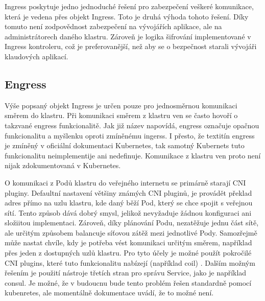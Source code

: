 Ingress poskytuje jedno jednoduché řešení pro zabezpečení veškeré komunikace, která je vedena přes objekt Ingress. Toto je druhá výhoda tohoto řešení. Díky tomuto není zodpovědnost zabezpečení na vývojářích aplikace, ale na administrátorech daného klastru. Zároveň je logika šifrování implementované v Ingress kontroleru, což je preferovanější, než aby se o bezpečnost starali vývojáři klaudových aplikací. \cite{koke_2023_bezpen}

\subsection{Engress}
Výše popsaný objekt Ingress je určen pouze pro jednosměrnou komunikaci směrem do klastru. Při komunikaci směrem z klastru ven se často hovoří o takzvané engress funkcionalitě. Jak již název napovídá, engress označuje opačnou funkcionalitu a myšlenku oproti zmíněnému ingerss. I přesto, že textitín engress je zmíněný v oficiální dokumentaci Kubernetes, tak samotný Kubernets tuto funkcionalitu neimplementije ani nedefinuje. Komunikace z klastru ven proto není nijak zdokumentovaná v Kubernetes.

O komunikaci z Podů klastru do veřejného internetu se primárně starají CNI pluginy. Defaultní nastavení většiny známých CNI pluginů, je provádět překlad adres přímo na uzlu klastru, kde daný běží Pod, který se chce spojit s veřejnou sítí. Tento způsob dává dobrý smysl, jelikož nevyžaduje žádnou konfiguraci ani složiitou implementaci. Zároveň, díky plánování Podu, nezatěžuje jednu část sítě, ale určitým způsobem balancuje síťovou zátěž mezi jednotlivé Pody. Samozřejmě může nastat chvíle, kdy je potřeba vést komunikaci určitým směrem, například přes jeden z dostupných uzlů klastru. Pro tyto účely je možné použít pokročilé CNI plugins, které tuto funkcionalitu nabízejí (například coil) \cite{yamamoto_2020_introducing}. Dalším možným řešením je použití nástroje třetích stran pro správu Service, jako je například consul. Je možné, že v budoucnu bude tento problém řešen standardně pomocí kubenretes, ale momentálně dokumentace uvádí, že to možné není. \cite{thekubernetesauthors_2022_network}




